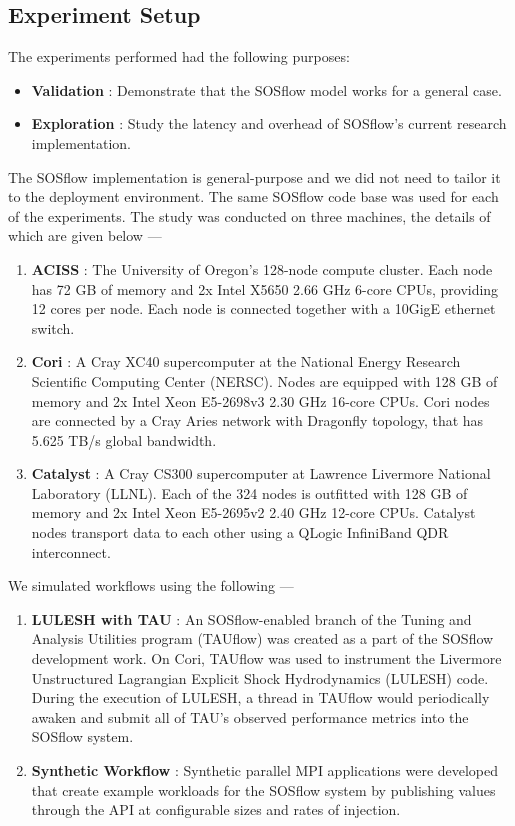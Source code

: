 \subsection{Experiment Setup} %
%
The experiments performed had the following purposes:
%
\begin{itemize}
\item \textbf{Validation} : Demonstrate that the SOSflow model works
  for a general case.
%
\item \textbf{Exploration} : Study the latency and overhead of
  SOSflow's current research implementation.
%
\end {itemize}
%
The SOSflow implementation is general-purpose and we did not need to
tailor it to the deployment environment.
%
The same SOSflow code base was used for each of the experiments.
%
The study was conducted on three machines, the details of which are
given below ---
%
\begin{enumerate}
%
\item \textbf{ACISS} : The University of Oregon's 128-node compute
  cluster.
%
Each node has 72 GB of memory and 2x Intel X5650 2.66 GHz 6-core CPUs,
providing 12 cores per node.
%
Each node is connected together with a 10GigE ethernet switch.
%
%
\item \textbf{Cori} : A Cray XC40 supercomputer at the National Energy Research Scientific
  Computing Center (NERSC).
%
Nodes are equipped with 128 GB of memory and 2x Intel Xeon
E5-2698v3 2.30 GHz 16-core CPUs.
%
Cori nodes are connected by a Cray Aries network with Dragonfly
topology, that has 5.625 TB/s global bandwidth.
%
%
\item \textbf{Catalyst} : A Cray CS300 supercomputer at Lawrence
  Livermore National Laboratory (LLNL).
%
Each of the 324 nodes is outfitted with 128 GB of memory and 2x Intel
Xeon E5-2695v2 2.40 GHz 12-core CPUs.
%
Catalyst nodes transport data to each other using a QLogic InfiniBand
QDR interconnect.
%
\end{enumerate}
%
%
We simulated workflows using the following --- 
%
\begin{enumerate}
%
\item \textbf{LULESH with TAU} : An SOSflow-enabled branch of the
  Tuning and Analysis Utilities program (TAUflow) was created as a
  part of the SOSflow development work.
%
On Cori, TAUflow was used to instrument the Livermore Unstructured
Lagrangian Explicit Shock Hydrodynamics (LULESH) code.
%
During the execution of LULESH, a thread in TAUflow would periodically
awaken and submit all of TAU's observed performance metrics into the
SOSflow system.
%
\item \textbf{Synthetic Workflow} : Synthetic parallel MPI
  applications were developed that create example workloads for the
  SOSflow system by publishing values through the API at configurable
  sizes and rates of injection.
%
\end{enumerate}
%
%


